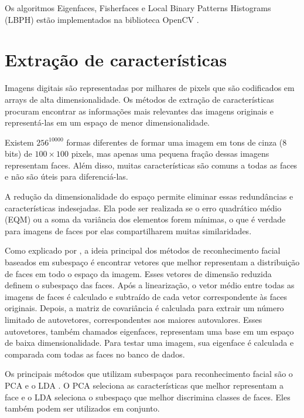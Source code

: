 Os algoritmos Eigenfaces, Fisherfaces e Local Binary Patterns Histograms (LBPH) estão implementados na biblioteca OpenCV \cite{opencvreconhecimento}.


\section{Extração de características}\label{sec:extract_caract}

Imagens digitais são representadas por milhares de pixels que são codificados em arrays de alta dimensionalidade. Os métodos de extração de características procuram encontrar as informações mais relevantes das imagens originais e representá-las em um espaço de menor dimensionalidade.

Existem $256^{10000}$ formas diferentes de formar uma imagem em tons de cinza (8 bits) de $100\times100$ pixels, mas apenas uma pequena fração dessas imagens representam faces. Além disso, muitas características são comuns a todas as faces e não são úteis para diferenciá-las.

A redução da dimensionalidade do espaço permite eliminar essas redundâncias e características indesejadas. Ela pode ser realizada se o erro quadrático médio (EQM) ou a soma da variância dos elementos forem mínimas, o que é verdade para imagens de faces por elas compartilharem muitas similaridades.

Como explicado por , a ideia principal dos métodos de reconhecimento facial baseados em subespaço é encontrar vetores que melhor representam a distribuição de faces em todo o espaço da imagem. Esses vetores de dimensão reduzida definem o subespaço das faces. Após a linearização, o vetor médio entre todas as imagens de faces é calculado e subtraído de cada vetor correspondente às faces originais. Depois, a matriz de covariância é calculada para extrair um número limitado de autovetores, correspondentes aos maiores autovalores. Esses autovetores, também chamados eigenfaces, representam uma base em um espaço de baixa dimensionalidade. Para testar uma imagem, sua eigenface é calculada e comparada com todas as faces no banco de dados.

Os principais métodos que utilizam subespaços para reconhecimento facial são o PCA e o LDA \cite{wang2004unified}. O PCA seleciona as características que melhor representam a face e o LDA seleciona o subespaço que melhor discrimina classes de faces. Eles também podem ser utilizados em conjunto.



